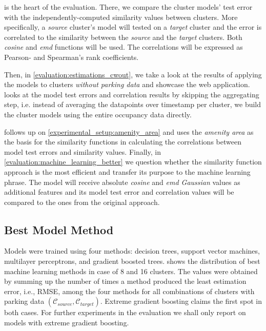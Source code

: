  is the heart of the evaluation. 
There, we compare the cluster models' test error with the independently-computed similarity values between clusters. 
More specifically, a \textit{source} cluster's model will tested on a \textit{target} cluster and the error is correlated to the similarity between the \textit{source} and the \textit{target} clusters. 
Both \textit{cosine} and \textit{emd} functions will be used. The correlations will be expressed as Pearson- and Spearman's rank coefficients.

Then, in \cref{evaluation:estimations_cwout}, we take a look at the results of applying the models to clusters \textit{without parking data} and showcase the web application.  looks at the model test errors and correlation results by skipping the aggregating step, i.e. instead of averaging the datapoints over timestamp per cluster, we build the cluster models using the entire occupancy data directly. 

 follows up on \cref{experimental_setup:amenity_area} and uses the \textit{amenity area} as the basis for the similarity functions in calculating the correlations between model test errors and similarity values. Finally, in \cref{evaluation:machine_learning_better} we question whether the similarity function approach is the most efficient and transfer its purpose to the machine learning phrase. The model will receive absolute \textit{cosine} and \textit{emd Gaussian} values as additional features and its model test error and correlation values will be compared to the ones from the original approach.

\subsection{Best Model Method}
\label{evaluation:best_model}
Models were trained using four methods: decision trees, support vector machines, multilayer perceptrons, and gradient boosted trees.  shows the distribution of best machine learning methods in case of 8 and 16 clusters.
The values were obtained by summing up the number of times a method produced the least estimation error, i.e., RMSE, among the four methods for all combinations of clusters with parking data $(\mathcal{C}_{source}, \mathcal{C}_{target})$.
Extreme gradient boosting claims the first spot in both cases.
For further experiments in the evaluation we shall only report on models with extreme gradient boosting.


